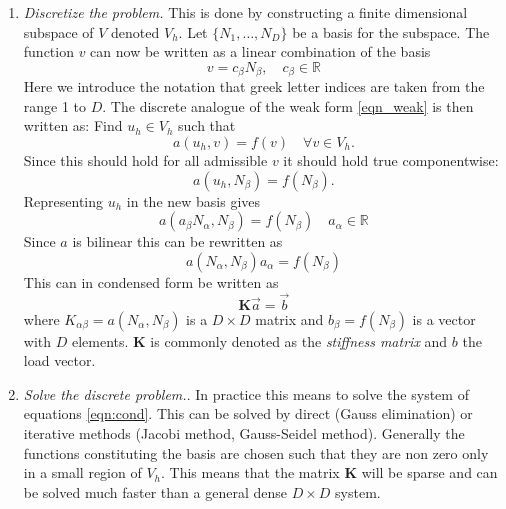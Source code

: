 \documentclass[fem.tex]{subfiles}
\begin{document}
\begin{enumerate}
\item \emph{Discretize the problem.} This is done by constructing a finite dimensional subspace of $V$ denoted $V_h$. Let $\{N_1, \ldots, N_D \}$  be a basis for the subspace. The function $v$ can now be written as a linear combination of the basis
%
\begin{equation} 
v =  c_\beta N_\beta, \quad c_\beta \in \mathbb{R} 
\end{equation}
%
Here we introduce the notation that greek letter indices are taken from the range 1 to $D$. The discrete analogue of the weak form \ref{eqn_weak} 
is then written as: Find $u_h \in V_h$ such that
%
\begin{equation} 
\label{eqn_disc_analo}
  a(u_h,v) = f(v) \quad \forall v \in V_h.
\end{equation}
Since this should hold for all admissible $v$ it should hold true componentwise:
\begin{equation} 
    a(u_h, N_\beta) = f(N_\beta).
    \label{eqn:disc_part}
\end{equation}
%
Representing $u_h$ in the new basis gives
\begin{equation} 
    a \left(a_\beta N_\alpha, N_\beta \right) = f(N_\beta ) \quad a_\alpha \in \mathbb{R}
    \label{eqn:u_new_base}
\end{equation}
%
Since $a$ is bilinear this can be rewritten as 
\begin{equation} 
    a \left( N_\alpha, N_\beta \right)a_\alpha = f(N_\beta)
    \label{eqn:final}
\end{equation}
%
This can in condensed form be written as
\begin{equation} 
    \mathbf{K} \vec{a} = \vec{b}
    \label{eqn:cond}
\end{equation}
where $K_{\alpha \beta} = a(N_\alpha, N_\beta)$ is a $D \times D$ matrix and $b_\beta = f(N_\beta)$ is a vector with $D$ elements. $\mathbf{K}$ is commonly denoted as the \textit{stiffness matrix} and $b$ the load vector.


\item \textit{Solve the discrete problem.}. In practice this means to solve the system of equations \ref{eqn:cond}. This can be solved by direct (Gauss elimination) or iterative methods (Jacobi method, Gauss-Seidel method). Generally the functions constituting the basis are chosen such that they are non zero only in a small region of $V_h$. This means that the matrix $\mathbf{K}$ will be sparse and can be solved much faster than a general dense $D \times D$ system.

\end{enumerate}
\end{document}

